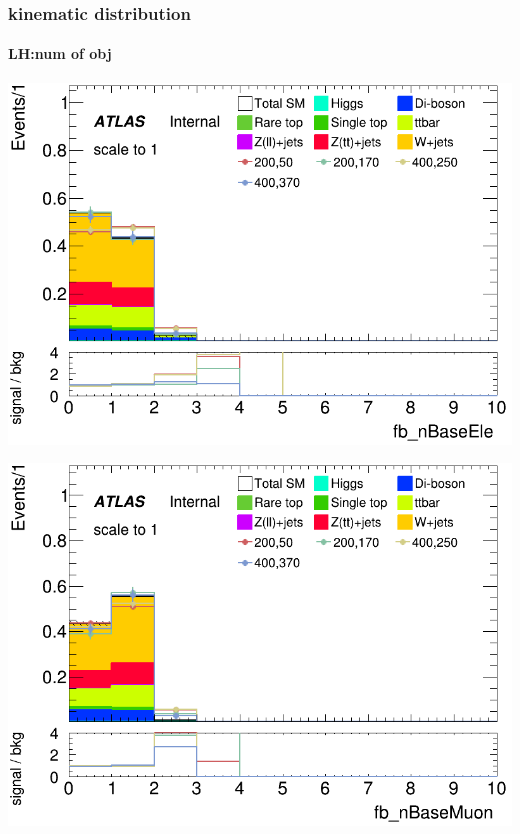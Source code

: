 \documentclass[usenames,dvipsnames]{beamer}
\begin{document}
\begin{frame}
\frametitle{kinematic distribution}
\framesubtitle{LH:num of obj}
    \begin{minipage}{0.2\textwidth}
        \centering
        \includegraphics[width=\textwidth]{graphics/LH_met_sig/LH_fb_nBaseEle_norm.png}
    \end{minipage}
    \hfill
    \begin{minipage}{0.2\textwidth}
        \centering
        \includegraphics[width=\textwidth]{graphics/LH_met_sig/LH_fb_nBaseMuon_norm.png}
    \end{minipage}
    \hfill
    \begin{minipage}{0.2\textwidth}
        \centering

\end{minipage}
\end{frame}
\end{document}
